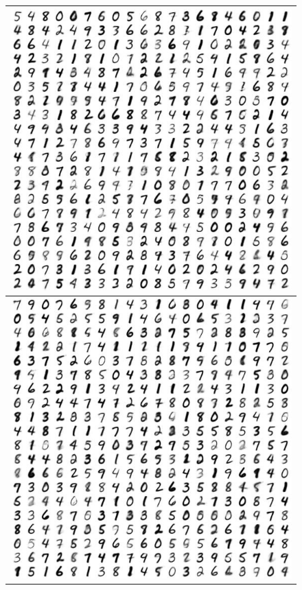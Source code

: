 \documentclass[letterpaper, twoside]{article}
\begin{document}
\begin{figure}[H]
\begin{minipage}{.33\textwidth}
\begin{tabular}{|@{}c@{}|}
\includegraphics[scale=0.5]{manifold_27.jpg}\\ \hline
\includegraphics[scale=0.5]{manifold_28.jpg}\\

\end{tabular}
\end{minipage}
\end{figure}
\end{document}
